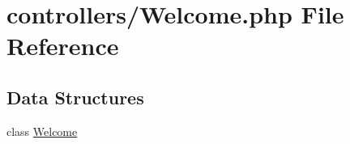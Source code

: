 \hypertarget{_welcome_8php}{}\section{controllers/\+Welcome.php File Reference}
\label{_welcome_8php}
\subsection*{Data Structures}
\begin{DoxyCompactItemize}
\item 
class \mbox{\hyperlink{class_welcome}{Welcome}}
\end{DoxyCompactItemize}

